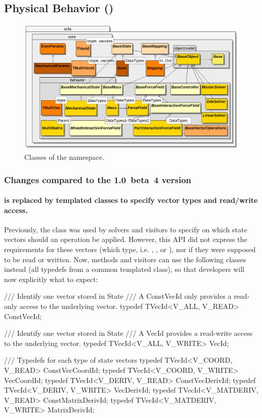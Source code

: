 \subsection{Physical Behavior ()}
\begin{figure}[h]
\centering
\includegraphics[scale=.33]{../classdiagrams/sofacore-behavior.png}
\caption{Classes of the  namespace.}
\label{fig:uml-sofa-core-behavior}
\end{figure}

\subsubsection{Changes compared to the 1.0~beta~4 version}\label{sec:design-core-behavior-changes}

\paragraph{ is replaced by templated classes to specify vector types and read/write access.}

Previously, the  class was used by solvers and visitors to specify on which state vectors should an operation be applied.
However, this API did not express the requirements for these vectors (which type, i.e. , , or ), nor if they were supposed to be read or written.
Now, methods and visitors can use the following classes instead (all typedefs from a common  templated class), so that developers will now explicitly what to expect:

\begin{code_cpp}
/// Identify one vector stored in State
/// A ConstVecId only provides a read-only access to the underlying vector.
typedef TVecId<V_ALL, V_READ> ConstVecId;

/// Identify one vector stored in State
/// A VecId provides a read-write access to the underlying vector.
typedef TVecId<V_ALL, V_WRITE> VecId;

/// Typedefs for each type of state vectors
typedef TVecId<V_COORD, V_READ> ConstVecCoordId;
typedef TVecId<V_COORD, V_WRITE>     VecCoordId;
typedef TVecId<V_DERIV, V_READ> ConstVecDerivId;
typedef TVecId<V_DERIV, V_WRITE>     VecDerivId;
typedef TVecId<V_MATDERIV, V_READ> ConstMatrixDerivId;
typedef TVecId<V_MATDERIV, V_WRITE>     MatrixDerivId;
\end{code_cpp}


